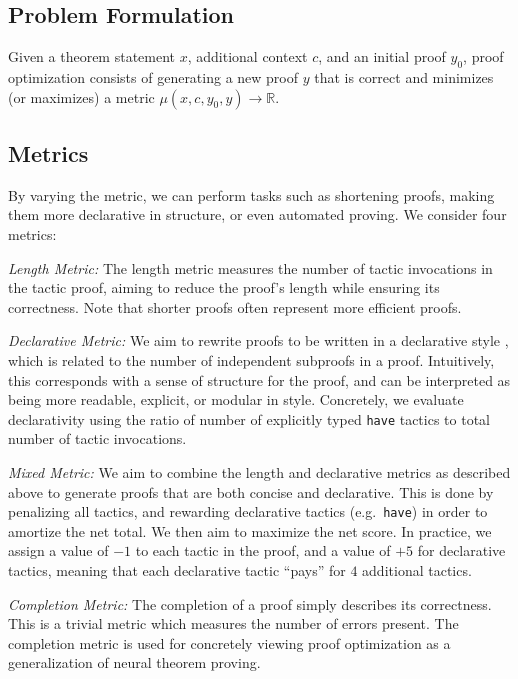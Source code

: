 \subsection{Problem Formulation}

Given a theorem statement $x$, additional context $c$, and an initial proof $y_0$, proof optimization consists of generating a new proof $y$ that is correct and minimizes (or maximizes) a metric $\mu(x,c,y_0, y)\rightarrow \mathbb{R}$.

\subsection{Metrics}
\label{ssec:metrics_31}

By varying the metric, we can perform tasks such as shortening proofs, making them more declarative in structure, or even automated proving. We consider four metrics:

\textit{Length Metric:} The length metric measures the number of tactic invocations in the tactic proof, aiming to reduce the proof's length while ensuring its correctness. Note that shorter proofs often represent more efficient proofs.

\textit{Declarative Metric:} We aim to rewrite proofs to be written in a declarative style \cite{serge2010,Wiedijk}, which is related to the number of independent subproofs in a proof. Intuitively, this corresponds with a sense of structure for the proof, and can be interpreted as being more readable, explicit, or modular in style. Concretely, we evaluate declarativity using the ratio of number of explicitly typed \texttt{have} tactics to total number of tactic invocations.

\textit{Mixed Metric:} We aim to combine the length and declarative metrics as described above to generate proofs that are both concise and declarative. This is done by penalizing all tactics, and rewarding declarative tactics (e.g.\ \texttt{have}) in order to amortize the net total. We then aim to maximize the net score. In practice, we assign a value of $-1$ to each tactic in the proof, and a value of $+5$ for declarative tactics, meaning that each declarative tactic ``pays'' for $4$ additional tactics.

\textit{Completion Metric:} The completion of a proof simply describes its correctness. This is a trivial metric which measures the number of errors present. The completion metric is used for concretely viewing proof optimization as a generalization of neural theorem proving.

